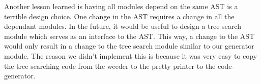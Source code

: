 \documentclass{article}
\begin{document}
Another lesson learned is having all modules depend on the same AST is a terrible design choice. One change in the AST requires a change in all the dependant modules. In the future, it would be useful to design a tree search module which serves as an interface to the AST. This way, a change to the AST would only result in a change to the tree search module similar to our generator module. The reason we didn't implement this is because it was very easy to copy the tree searching code from the weeder to the pretty printer to the code-generator. 




\end{document}
